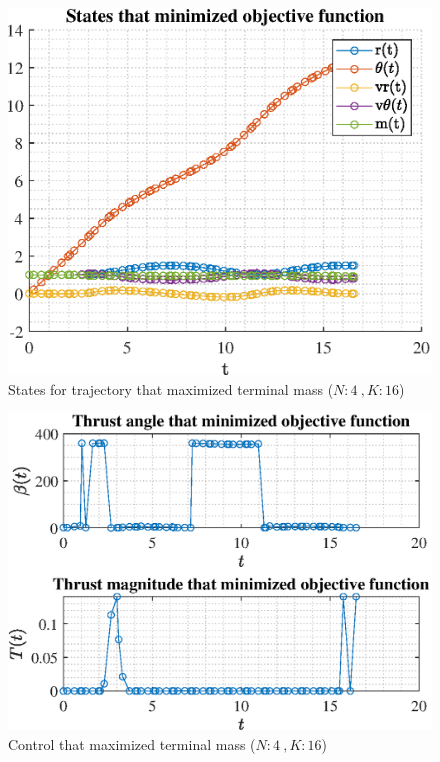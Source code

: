 \documentclass[]{article}
\begin{document}
\begin{figure}
	\centering
	\includegraphics[scale=0.75]{states_N4_K16_C3_mf.eps}
	\caption{States for trajectory that maximized terminal mass (\(N:4\ , K:16\))}
	\label{fig:states_N4_K16_C3_mf}
\end{figure}
\begin{figure}
	\centering
	\includegraphics[scale=0.75]{control_N4_K16_C3_mf.eps}
	\caption{Control that maximized terminal mass (\(N:4\ , K:16\))}
	\label{fig:control_N4_K16_C3_mf}
\end{figure}
\end{document}
